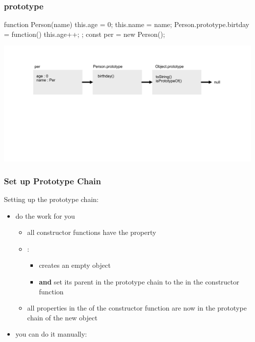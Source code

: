 \begin{frame}[fragile] \frametitle{prototype}
\begin{CodeBox}{}
function Person(name) {
  this.age = 0;
  this.name = name;
}
Person.prototype.birtday = function() { this.age++; };
const per = new Person();
\end{CodeBox}
  \centering
  \includegraphics[width=14cm]{img/prototype_chain3}
\end{frame}

\begin{frame}[fragile] \frametitle{Set up Prototype Chain}
Setting up the prototype chain:
\begin{itemize}
  \item {} do the work for you
  \begin{itemize}
    \item all constructor functions have the  property
    \item {}:
    \begin{itemize}
      \item creates an empty object
      \item {\bf and} set its parent in the prototype chain to the  in the constructor function
    \end{itemize}
    \item all properties in the  of the constructor function are now in the prototype chain of the new object
  \end{itemize}
  \item you can do it manually: 
\end{itemize}
\end{frame}

